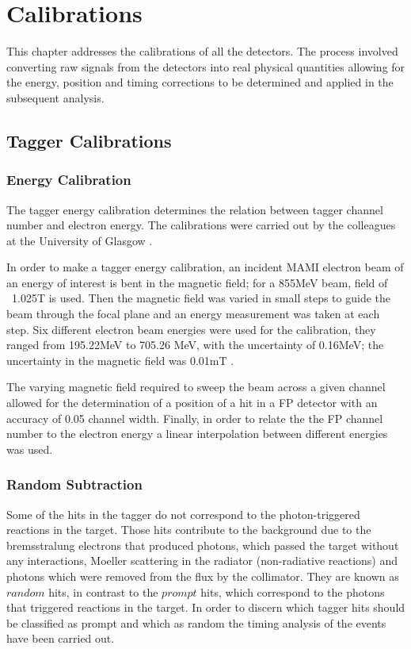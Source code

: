 \chapter{Calibrations}

\indent This chapter addresses the calibrations of all the detectors. The process involved converting raw signals from the detectors into real physical quantities allowing for the energy, position and timing corrections to be determined and applied in the subsequent analysis.

\section{Tagger Calibrations}

\subsection{Energy Calibration}

\indent The tagger energy calibration determines the relation between tagger channel number and electron energy. The calibrations were carried out by the colleagues at the University of Glasgow \cite{mcgeorge}.

\indent In order to make a tagger energy calibration, an incident MAMI electron beam of an energy of interest is bent in the magnetic field; for a 855MeV beam, field of ~1.025T is used. Then the magnetic field was varied in small steps to guide the beam through the focal plane and an energy measurement was taken at each step. Six different electron beam energies were used for the calibration, they ranged from 195.22MeV to 705.26 MeV, with the uncertainty of 0.16MeV; the uncertainty in the magnetic field was 0.01mT \cite{duncan}.

\indent The varying magnetic field required to sweep the beam across a given channel allowed for the determination of a position of a  hit in a FP detector with an accuracy of 0.05 channel width. Finally, in order to relate the the FP channel number to the electron energy a linear interpolation between different energies was used.

\subsection{Random Subtraction}

\indent Some of the hits in the tagger do not correspond to the photon-triggered reactions in the target. Those hits contribute to the background due to the bremsstralung electrons that produced photons, which passed the target without any interactions, Moeller scattering in the radiator (non-radiative reactions) and photons which were removed from the flux by the collimator. They are known as $random$ hits, in contrast to the $prompt$ hits, which correspond to the photons that triggered reactions in the target. In order to discern which tagger hits should be classified as prompt and which as random the timing analysis of the events have been carried out.


